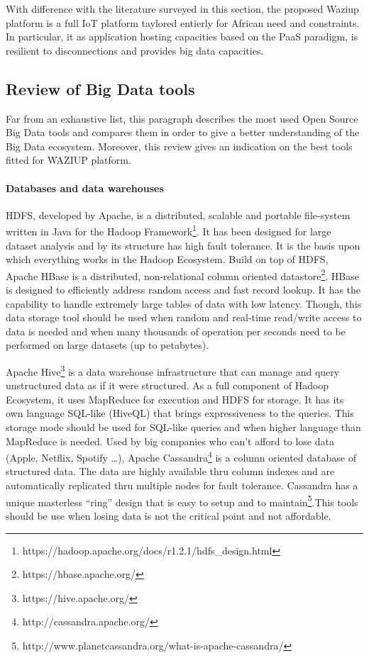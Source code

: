 With difference with the literature surveyed in this section, the proposed Waziup platform is a full IoT platform taylored entierly for African need and constraints.
In particular, it as application hosting capacities based on the PaaS paradigm, is resilient to disconnections and provides big data capacities.



\subsection{Review of Big Data tools}

Far from an exhaustive list, this paragraph describes the most used Open Source Big Data tools and compares them in order to give a better understanding of the Big Data ecosystem. Moreover, this review gives an indication on the best tools fitted for WAZIUP platform. 


\paragraph{Databases and data warehouses}

HDFS, developed by Apache, is a distributed, scalable and portable file-system written in Java for the Hadoop Framework\footnote{https://hadoop.apache.org/docs/r1.2.1/hdfs\_design.html}.
It has been designed for large dataset analysis and by its structure has high fault tolerance. It is the basis upon which everything works in the Hadoop Ecosystem.
Build on top of HDFS, Apache HBase is a distributed, non-relational column oriented datastore\footnote{https://hbase.apache.org/}.
HBase is designed to efficiently address random access and fast record lookup.
It has the capability to handle extremely large tables of data with low latency.
Though, this data storage tool should be used when random and real-time read/write access to data is needed and when many thousands of operation per seconds need to be performed on large datasets (up to petabytes).

Apache Hive\footnote{https://hive.apache.org/} is a data warehouse infrastructure that can manage and query unstructured data as if it were structured.
As a full component of Hadoop Ecosystem, it uses MapReduce for execution and HDFS for storage.
It has its own language SQL-like (HiveQL) that brings expressiveness to the queries.
This storage mode should be used for SQL-like queries and when higher language than MapReduce is needed.
Used by big companies who can’t afford to lose data (Apple, Netflix, Spotify …), Apache Cassandra\footnote{http://cassandra.apache.org/} is a column oriented database of structured data. The data are highly available thru column indexes and are automatically replicated thru multiple nodes for fault tolerance.
Cassandra has a unique masterless “ring” design that is easy to setup and to maintain\footnote{http://www.planetcassandra.org/what-is-apache-cassandra/}.This tools should be use when losing data is not the critical point and not affordable.  

